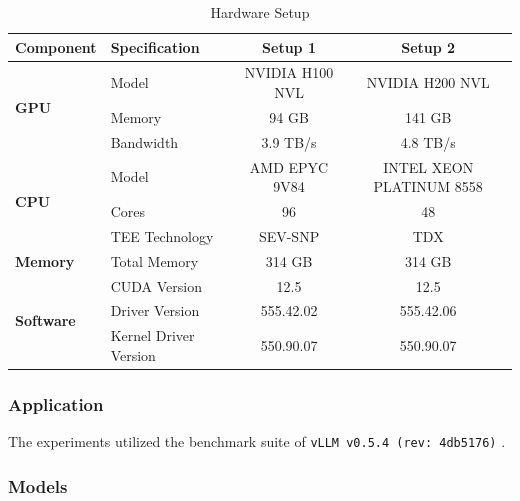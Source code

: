 \documentclass{article}
\begin{document}
\begin{table}[htbp]
    \centering
    \begin{tabular}{llcc}
        \toprule
        \textbf{Component}                 & \textbf{Specification} & \textbf{Setup 1} & \textbf{Setup 2}         \\
        \midrule
        \multirow{3}{*}{\textbf{GPU}}      & Model                  & NVIDIA H100 NVL  & NVIDIA H200 NVL          \\
                                           & Memory                 & 94 GB            & 141 GB                   \\
                                           & Bandwidth              & 3.9 TB/s         & 4.8 TB/s                 \\
        \midrule
        \multirow{3}{*}{\textbf{CPU}}      & Model                  & AMD EPYC 9V84    & INTEL XEON PLATINUM 8558 \\
                                           & Cores                  & 96               & 48                       \\
                                           & TEE Technology         & SEV-SNP          & TDX                      \\
        \midrule
        \textbf{Memory}                    & Total Memory           & 314 GB           & 314 GB                   \\
        \midrule
        \multirow{3}{*}{\textbf{Software}} & CUDA Version           & 12.5             & 12.5                     \\
                                           & Driver Version         & 555.42.02        & 555.42.06                \\
                                           & Kernel Driver Version  & 550.90.07        & 550.90.07                \\
        \bottomrule
    \end{tabular}
    \caption{Hardware Setup}
    \label{tab:hardware_setup}
\end{table}

\subsubsection{Application}

The experiments utilized the benchmark suite of \texttt{vLLM v0.5.4 (rev: 4db5176)} \cite{kwon2023efficient}.

\subsubsection{Models}
\end{document}
